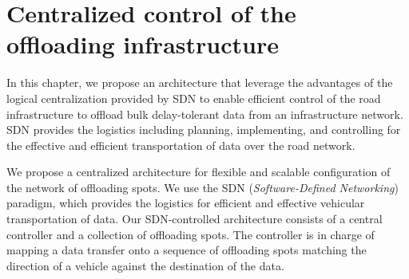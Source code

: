 \chapter{Centralized control of the offloading infrastructure}
\label{cha:vehicular-offloading-service}

In this chapter, we propose an architecture  that leverage the advantages of the logical centralization provided by SDN to enable efficient control of the road infrastructure to offload bulk delay-tolerant data from an infrastructure network. SDN provides the logistics including planning, implementing, and controlling for the effective and efficient transportation of data over the road network.  



We propose a centralized architecture for flexible and scalable configuration of the network of offloading spots. We use the SDN (\textit{Software-Defined Networking}) paradigm, which provides the logistics for efficient and effective vehicular transportation of data. Our SDN-controlled architecture consists of a central controller and a collection of offloading spots. 
The controller is in charge of mapping a data transfer onto a sequence of offloading spots matching the direction of a vehicle against the destination of the data.


